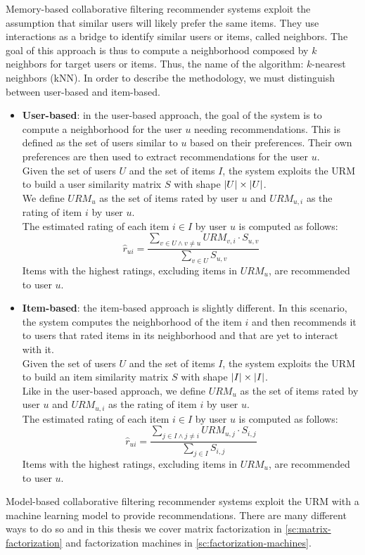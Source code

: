 Memory-based collaborative filtering recommender systems \cite{10.1007/978-0-387-85820-3_1} exploit the assumption that similar users will likely prefer the same items. They use interactions as a bridge to identify similar users or items, called neighbors. The goal of this approach is thus to compute a neighborhood composed by $k$ neighbors for target users or items. Thus, the name of the algorithm: $k$-nearest neighbors (kNN). In order to describe the methodology, we must distinguish between user-based and item-based.
\begin{itemize}
\item \textbf{User-based}: in the user-based approach, the goal of the system is to compute a neighborhood for the user $u$ needing recommendations. This is defined as the set of users similar to $u$ based on their preferences. Their own preferences are then used to extract recommendations for the user $u$.\\
Given the set of users $U$ and the set of items $I$, the system exploits the URM to build a user similarity matrix $S$ with shape $\left\lvert U\right\rvert \times \left\lvert U\right\rvert$.\\
We define $URM_u$ as the set of items rated by user $u$ and $URM_{u,i}$ as the rating of item $i$ by user $u$.\\
The estimated rating of each item $i \in I$ by user $u$ is computed as follows:
\begin{equation*}
\hat{r}_{ui} = \frac{\sum_{v \in U \wedge v \neq u} URM_{v,i} \cdot S_{u,v}}{\sum_{v \in U} S_{u,v}}
\end{equation*}
Items with the highest ratings, excluding items in $URM_u$, are recommended to user $u$.
\item \textbf{Item-based}: the item-based approach is slightly different. In this scenario, the system computes the neighborhood of the item $i$ and then recommends it to users that rated items in its neighborhood and that are yet to interact with it.\\
Given the set of users $U$ and the set of items $I$, the system exploits the URM to build an item similarity matrix $S$ with shape $\left\lvert I\right\rvert \times \left\lvert I\right\rvert$.\\
Like in the user-based approach, we define $URM_u$ as the set of items rated by user $u$ and $URM_{u,i}$ as the rating of item $i$ by user $u$.\\
The estimated rating of each item $i \in I$ by user $u$ is computed as follows:
\begin{equation*}
\hat{r}_{ui} = \frac{\sum_{j \in I \wedge j \neq i} URM_{u,j} \cdot S_{i,j}}{\sum_{j \in I} S_{i,j}}
\end{equation*}
Items with the highest ratings, excluding items in $URM_u$, are recommended to user $u$.
\end{itemize}\par
Model-based collaborative filtering recommender systems exploit the URM with a machine learning model to provide recommendations. There are many different ways to do so and in this thesis we cover matrix factorization in \autoref{sc:matrix-factorization} and factorization machines in \autoref{sc:factorization-machines}.



